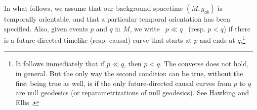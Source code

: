 \documentclass [12] {article}
\theoremstyle{plain}
\numberwithin{figure}{subsection}
\numberwithin{proposition}{subsection}
\begin{document}




In what follows, we assume that our background spacetime $(M, g_{ab})$ is temporally orientable, and that a particular temporal orientation has been specified. Also, given events $p$ and $q$ in $M$, we write \,  $p \ll q$ \, (resp. $p <q$)  if there is a future-directed timelike (resp. causal) curve that starts at $p$ and ends at $q$.\footnote{It follows immediately that if   $p \ll q$,    then   $p <q$. The converse does not hold, in general. But the only way the second condition can be true, without the  first being true as well, is if the only future-directed causal curves from $p$ to $q$ are null geodesics (or reparametrizations of null geodesics).  See Hawking and Ellis .}    
\end{document}
